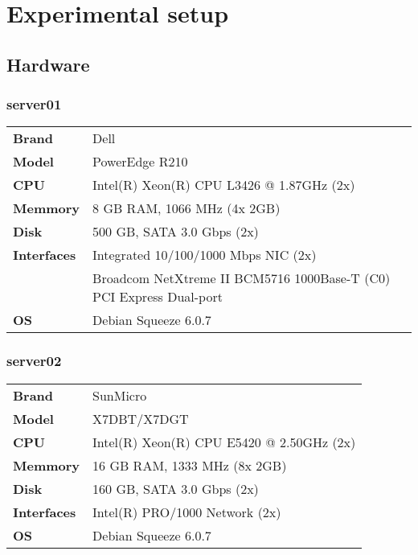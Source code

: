 \documentclass[Configuration]{subfiles}
\begin{document}
\section{Experimental setup}
\label{sec:Experimental setup}

\subsection{Hardware}

\subsubsection{server01}
\begin{table}[h]
\centering
\begin{tabular}{p{2cm} p{9cm} }
\textbf{Brand} & Dell \\
\textbf{Model} & PowerEdge R210 \\
\textbf{CPU} & Intel(R) Xeon(R) CPU L3426 @ 1.87GHz (2x)\\
\textbf{Memmory} & 8 GB RAM, 1066 MHz (4x 2GB) \\
\textbf{Disk} & 500 GB, SATA 3.0 Gbps (2x)\\
\textbf{Interfaces} &  Integrated 10/100/1000 Mbps NIC (2x) \\
 & Broadcom NetXtreme II BCM5716 1000Base-T (C0) PCI Express Dual-port \\ 
\textbf{OS} & Debian Squeeze 6.0.7 \\
\end{tabular}
\end{table}

\subsubsection{server02}
\begin{table}[h]
\centering
\begin{tabular}{p{2cm} p{9cm} }
\textbf{Brand} & SunMicro \\
\textbf{Model} & X7DBT/X7DGT \\
\textbf{CPU} & Intel(R) Xeon(R) CPU E5420 @ 2.50GHz (2x)\\
\textbf{Memmory} & 16 GB RAM, 1333 MHz (8x 2GB) \\
\textbf{Disk} & 160 GB, SATA 3.0 Gbps (2x)\\
\textbf{Interfaces} &   Intel(R) PRO/1000 Network (2x) \\
\textbf{OS} & Debian Squeeze 6.0.7 \\
\end{tabular}
\end{table}
\end{document}
